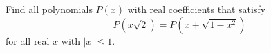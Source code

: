 Find all polynomials $P(x)$ with real coefficients that satisfy \[P(x\sqrt{2})=P(x+\sqrt{1-x^2})\] for all real $x$ with $\left|x\right|\leq1$.